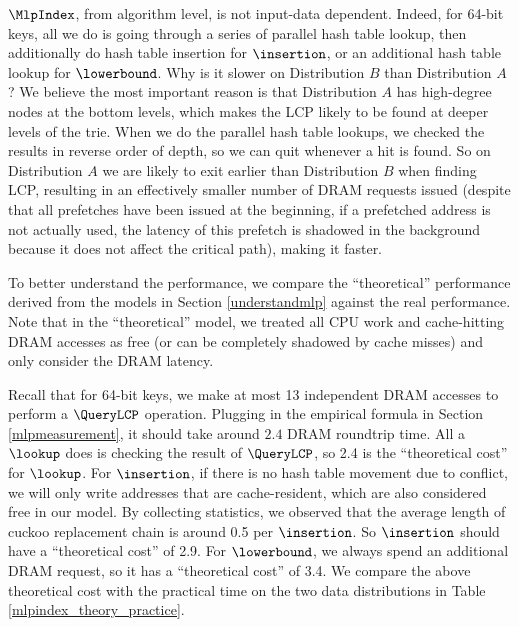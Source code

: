 \documentclass[11pt, usletter]{article}
\begin{document}
$\MlpIndex$, from algorithm level, is not input-data dependent. 
Indeed, for 64-bit keys, all we do is going through a series of parallel hash table lookup, 
then additionally do hash table insertion for $\insertion$, or an additional hash table lookup for $\lowerbound$. 
Why is it slower on Distribution $B$ than Distribution $A$? 
We believe the most important reason is that Distribution $A$ has high-degree nodes at the bottom levels, 
which makes the LCP likely to be found at deeper levels of the trie. 
When we do the parallel hash table lookups, we checked the results in reverse order of depth, 
so we can quit whenever a hit is found. 
So on Distribution $A$ we are likely to exit earlier than Distribution $B$ when finding LCP, 
resulting in an effectively smaller number of DRAM requests issued 
(despite that all prefetches have been issued at the beginning, if a prefetched address is not actually used, 
the latency of this prefetch is shadowed in the background because it does not affect the critical path), 
making it faster.

To better understand the performance, 
we compare the ``theoretical'' performance derived from the models in Section \ref{understandmlp} against the real performance. 
Note that in the ``theoretical'' model, 
we treated all CPU work and cache-hitting DRAM accesses as free (or can be completely shadowed by cache misses) 
and only consider the DRAM latency.

Recall that for 64-bit keys, we make at most 13 independent DRAM accesses to perform a $\QueryLCP$ operation. 
Plugging in the empirical formula in Section \ref{mlpmeasurement}, it should take around $2.4$ DRAM roundtrip time.
All a $\lookup$ does is checking the result of $\QueryLCP$, so 2.4 is the ``theoretical cost'' for $\lookup$. 
For $\insertion$, if there is no hash table movement due to conflict, we will only write addresses that are cache-resident, 
which are also considered free in our model. 
By collecting statistics, we observed that the average length of cuckoo replacement chain is around 0.5 per $\insertion$. 
So $\insertion$ should have a ``theoretical cost'' of 2.9.
For $\lowerbound$, we always spend an additional DRAM request, 
so it has a ``theoretical cost'' of 3.4. We compare the above theoretical cost with the practical time 
on the two data distributions in Table \ref{mlpindex_theory_practice}.
\end{document}
